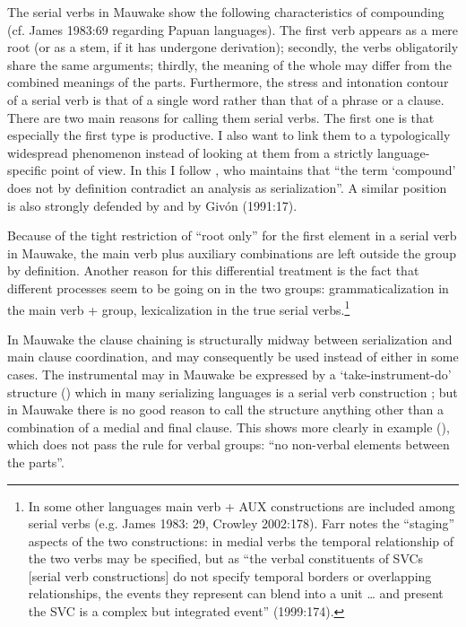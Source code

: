 The serial verbs in Mauwake show the following characteristics of compounding (cf. James 1983:69 regarding Papuan languages). The first verb appears as a mere root (or as a stem, if it has undergone derivation); secondly, the verbs obligatorily share the same arguments; thirdly, the meaning of the whole may differ from the combined meanings of the parts. Furthermore, the stress and intonation contour of a serial verb is that of a single word rather than that of a phrase or a clause. There are two main reasons for calling them serial verbs. The first one is that especially the first type is productive. I also want to link them to a typologically widespread phenomenon instead of looking at them from a strictly language-specific point of view. In this I follow \citet[101]{Margetts1999}, who maintains that ``{the term `compound' does not by definition contradict an analysis as serialization}''. A similar position is also strongly defended by \citet[16]{Crowley2002} and by Giv\'on (1991:17).

Because of the tight restriction of ``root only'' for the first element in a serial verb in Mauwake, the main verb plus auxiliary combinations are left outside the group by definition. Another reason for this differential treatment is the fact that different processes seem to be going on in the two groups: grammaticalization in the main verb +  group, lexicalization in the true serial verbs.\footnote{In some other languages main verb + AUX constructions are included among serial verbs (e.g. James 1983: 29, Crowley 2002:178). Farr notes the ``staging'' aspects of the two constructions: in medial verbs the temporal relationship of the two verbs may be specified, but as ``the verbal constituents of SVCs [serial verb constructions] do not specify temporal borders or overlapping relationships, the events they represent can blend into a unit {\dots} and present the SVC is a complex but integrated event'' (1999:174).} 

In Mauwake the clause chaining is structurally midway between serialization and main clause coordination, and may consequently be used instead of either in some cases. The instrumental may in Mauwake be expressed by a `take-instrument-do' structure () which in many serializing languages is a serial verb construction \citep[162--74]{Sebba1987}; but in Mauwake there is no good reason to call the structure anything other than a combination of a medial and final clause. This shows more clearly in example (), which does not pass the rule for verbal groups: ``no non-verbal elements between the parts''. 

